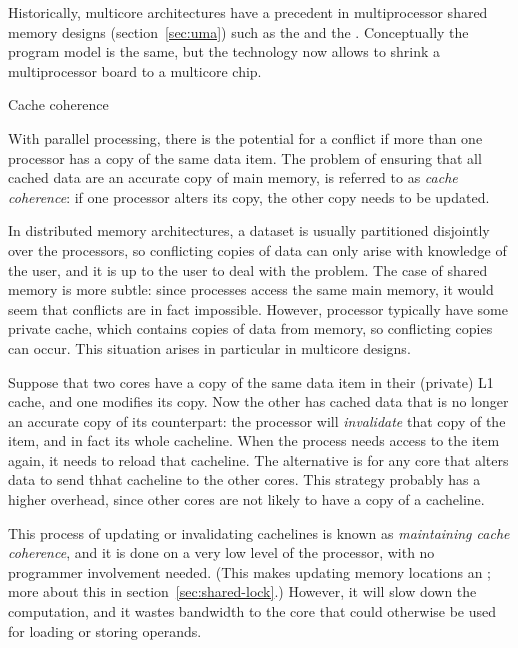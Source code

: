 Historically, multicore architectures have a precedent in
multiprocessor shared memory designs (section~\ref{sec:uma}) such as
the  and the . Conceptually the program model is the same, but the
technology now allows to shrink a multiprocessor board to a multicore
chip.

 {Cache coherence}
\label{sec:coherence}

With parallel processing, there is the potential for a conflict if more
than one processor has a copy of the same data item. The problem of
ensuring that all cached data are an accurate copy of main memory, is
referred to as \emph{cache coherence}: if one processor alters
its copy, the other copy needs to be updated.

In distributed memory architectures, a dataset is usually partitioned
disjointly over the processors, so conflicting copies of data can only
arise with knowledge of the user, and it is up to the user to
deal with the problem. The case of shared memory is more subtle: since
processes access the same main memory, it would seem that conflicts
are in fact impossible. However, processor typically have some private
cache, which contains copies of data from memory, so conflicting
copies can occur.  This situation arises in particular in multicore
designs.

Suppose that two cores have a copy of the same data item in their
(private) L1 cache, and one modifies its copy. Now the other has
cached data that is no longer an accurate copy of its counterpart: the
processor will \emph{invalidate} that
copy of the item, and in fact its whole cacheline. When the process
needs access to the item again, it needs to reload that cacheline.
The alternative is for any core that alters data to send thhat
cacheline to the other cores. This strategy probably has a higher overhead,
since other cores are not likely to have a copy of a cacheline.

This process of updating or invalidating cachelines
is known as \emph{maintaining cache coherence}, and it is done on
a very low level of the processor, with no programmer involvement
needed. (This makes updating memory locations an ; more about this in section~\ref{sec:shared-lock}.)
However, it will slow down the computation, and it wastes bandwidth to
the core that could otherwise be used for loading or storing operands.

